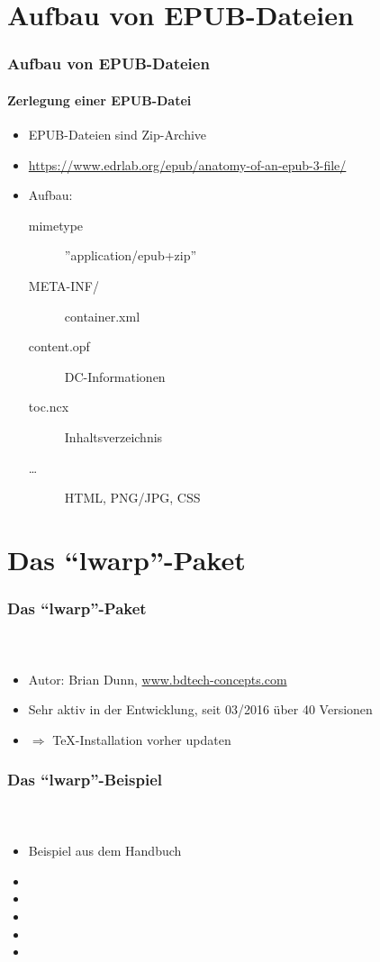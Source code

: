 \documentclass[12pt,ngerman]{beamer}
\begin{document}
\section{Aufbau von EPUB-Dateien}

\begin{frame}
\frametitle{Aufbau von EPUB-Dateien}
\framesubtitle{Zerlegung einer EPUB-Datei}

\begin{itemize}
\item EPUB-Dateien sind Zip-Archive
\item \url{https://www.edrlab.org/epub/anatomy-of-an-epub-3-file/}
\item Aufbau:

\begin{description}
\item [mimetype] ''application/epub+zip''
\item [META-INF/] container.xml
\item [content.opf] DC-Informationen
\item [toc.ncx] Inhaltsverzeichnis
\item [\ldots] HTML, PNG/JPG, CSS 
\end{description}
\end{itemize}

\end{frame}

\section{Das \enquote{lwarp}-Paket}

\begin{frame}
\frametitle{Das \enquote{lwarp}-Paket}
\framesubtitle{~}

\begin{itemize}
\item Autor: Brian Dunn, \url{www.bdtech-concepts.com}
\item Sehr aktiv in der Entwicklung, seit 03/2016 über 40 Versionen
\item $\Rightarrow$ \TeX-Installation vorher updaten
\end{itemize}

\end{frame}

\begin{frame}
\frametitle{Das \enquote{lwarp}-Beispiel}
\framesubtitle{~}

\begin{itemize}
\item Beispiel aus dem Handbuch
\item 
\item 
\item 
\item 
\item 
\end{itemize}
\end{frame}
\end{document}
